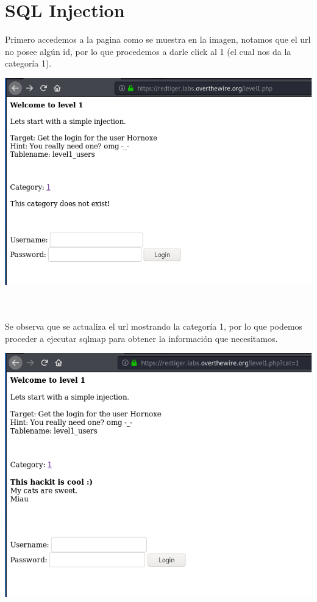 \documentclass[11pt,letterpaper]{article}
\begin{document}
\section{SQL Injection}
Primero accedemos a la pagina como se muestra en la imagen, notamos que el url no posee algún id, por lo que procedemos a darle click al 1 (el cual nos da la categoría 1).\\
\begin{center}
\includegraphics[scale=.6]{./Img/sqlmap0.png}
\end{center}~\\~\\
Se observa que se actualiza el url mostrando la categoría 1, por lo que podemos proceder a ejecutar sqlmap para obtener la información que necesitamos.\\
\begin{center}
\includegraphics[scale=.6]{./Img/sqlmap1.png}
\end{center}~\\~\\
\end{document}
